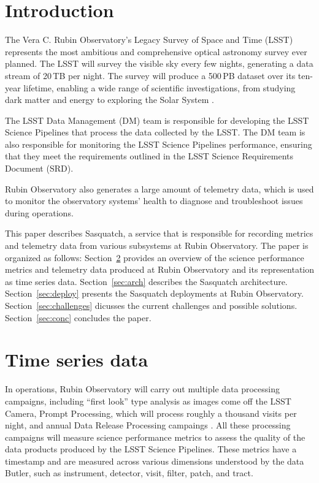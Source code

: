 \section{Introduction}

The Vera C. Rubin Observatory's Legacy Survey of Space and Time (LSST) represents the most ambitious and comprehensive optical astronomy survey ever planned. The LSST will survey the visible sky every few nights, generating a data stream of 20\,TB per night. The survey will produce a 500\,PB dataset over its ten-year lifetime, enabling a wide range of scientific investigations, from studying dark matter and energy to exploring the Solar System \cite{2019ApJ...873..111I}.

The LSST Data Management (DM) team is responsible for developing the LSST Science Pipelines that process the data collected by the LSST. The DM team is also responsible for monitoring the LSST Science Pipelines performance, ensuring that they meet the requirements outlined in the LSST Science Requirements Document (SRD). \cite{LPM-17}

Rubin Observatory also generates a large amount of telemetry data, which is used to monitor the observatory systems' health to diagnose and troubleshoot issues during operations.

This paper describes Sasquatch, a service that is responsible for recording metrics and telemetry data from various subsystems at Rubin Observatory. The paper is organized as follows: Section~\ref{sec:tsd} provides an overview of the science performance metrics and telemetry data produced at Rubin Observatory and its representation as time series data. Section~\ref{sec:arch} describes the Sasquatch architecture. Section~\ref{sec:deploy} presents the Sasquatch deployments at Rubin Observatory. Section~\ref{sec:challenges} dicusses the current challenges and possible solutions. Section~\ref{sec:conc} concludes the paper.

\section{Time series data}
\label{sec:tsd}

In operations, Rubin Observatory will carry out multiple data processing campaigns, including ``first look'' type analysis as images come off the LSST Camera, Prompt Processing, which will process roughly a thousand visits per night, and annual Data Release Processing campaings \cite{LSE-163}. All these processing campaigns will measure science performance metrics to assess the quality of the data products produced by the LSST Science Pipelines. \cite{2019ASPC..523..521B,2022SPIE12189E..0MG} These metrics have a timestamp and are measured across various dimensions understood by the data Butler,\cite{2022SPIE12189E..11J} such as instrument, detector, visit, filter, patch, and tract.

